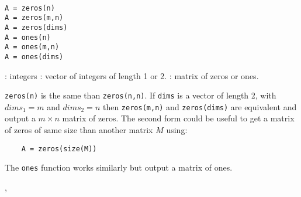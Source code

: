 \begin{mandesc}
  \\ 
\end{mandesc}
\begin{calling_sequence}
\begin{verbatim}
A = zeros(n)
A = zeros(m,n)
A = zeros(dims)
A = ones(n)
A = ones(m,n)
A = ones(dims)
\end{verbatim}
\end{calling_sequence}
\begin{parameters}
  \begin{varlist}
    : integers
    : vector of integers of length 1 or 2.
    : matrix of zeros or ones.
  \end{varlist}
\end{parameters}

\begin{mandescription}
\verb+zeros(n)+ is the same than \verb+zeros(n,n)+. If \verb+dims+ is a vector of length 2, 
with $dims_1 = m$ and $dims_2 = n$ then \verb+zeros(m,n)+ and  \verb+zeros(dims)+ are equivalent 
and output a $m \times n$ matrix of zeros. The second form could be useful to get a matrix of 
zeros of same size than another matrix $M$ using:
\begin{verbatim}
    A = zeros(size(M))
\end{verbatim}

The \verb+ones+ function works similarly but output a matrix of ones.

\end{mandescription}


\begin{examples}
\begin{program}
\end{program} 

\end{examples}

\begin{manseealso}
, 
\end{manseealso}

